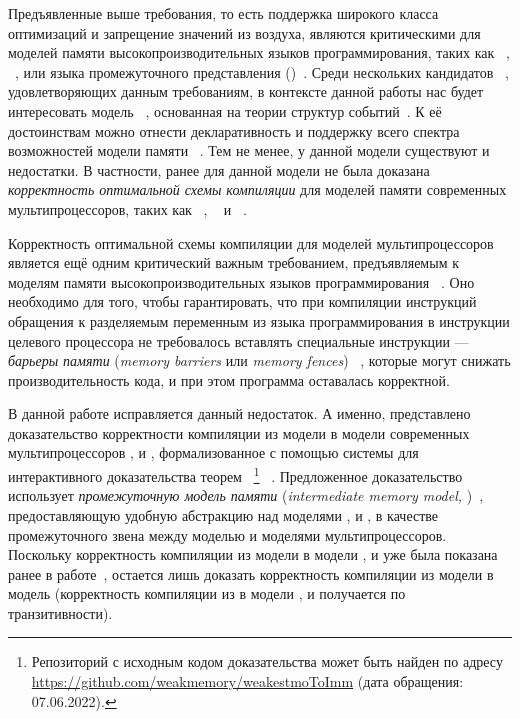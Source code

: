 Предъявленные выше требования, 
то есть поддержка широкого класса оптимизаций и 
запрещение значений из воздуха, являются 
критическими для моделей памяти высокопроизводительных 
языков программирования, таких как \CPP~\cite{Batty-al:POPL11}, 
\Java~\cite{Manson-al:POPL05}, или языка промежуточного представления \LLVM 
(\LLVMIR)~\cite{Chakraborty-Vafeiadis:CGO17}.
Среди нескольких кандидатов~%
\cite{Kang-al:POPL17,Paviotti-al:ESOP20,Jagadeesan-al:OOPSLA2020}, 
удовлетворяющих данным требованиям, в контексте данной работы нас будет 
интересовать модель \Wkm~\cite{Chakraborty-Vafeiadis:POPL19}, 
основанная на теории структур событий~\cite{Winskel:86}. 
К её достоинствам можно отнести декларативность и поддержку 
всего спектра возможностей модели памяти \CPP~\cite{Batty-al:POPL11}. 
Тем не менее, у данной модели существуют и недостатки. 
В частности, ранее для данной модели не была доказана 
\emph{корректность оптимальной схемы компиляции} для моделей памяти 
современных мультипроцессоров, таких как 
\Intel~\cite{Sewell-al:CACM10}, \ARM~\cite{Pulte-al:POPL18} 
и \POWER~\cite{Alglave-al:TOPLAS14}. 
 
Корректность оптимальной схемы компиляции для моделей мультипроцессоров 
является ещё одним критический важным требованием, 
предъявляемым к моделям памяти высокопроизводительных языков программирования%
~\cite{Moiseenko-al:PCS21}.
Оно необходимо для того, чтобы гарантировать, 
что при компиляции инструкций обращения к разделяемым переменным 
из языка программирования в инструкции целевого процессора
не требовалось вставлять специальные инструкции --- 
\emph{барьеры памяти} (\emph{memory barriers} или \emph{memory fences})%
~\cite{McKenney:2010}, которые могут снижать производительность кода,
и при этом программа оставалась корректной. 

В данной работе исправляется данный недостаток. 
А именно, представлено доказательство корректности компиляции
из модели \Wkm в модели современных мультипроцессоров \Intel, \ARM и \POWER, 
формализованное с помощью системы для интерактивного 
доказательства теорем~\coq%
\footnote{Репозиторий с исходным кодом доказательства может быть найден 
по адресу \url{https://github.com/weakmemory/weakestmoToImm} (дата обращения: 07.06.2022).}%
~\cite{Coq}.
Предложенное доказательство использует \emph{промежуточную модель памяти}
(\emph{intermediate memory model, \IMM})~\cite{Podkopaev-al:POPL19}, 
предоставляющую удобную абстракцию над моделями \Intel, \ARM и \POWER, 
в качестве промежуточного звена между моделью \Wkm и моделями мультипроцессоров.
Поскольку корректность компиляции из модели \IMM в модели \Intel, \ARM и \POWER
уже была показана ранее в работе~\cite{Podkopaev-al:POPL19},
остается лишь доказать корректность компиляции из модели \Wkm
в модель \IMM (корректность компиляции из \Wkm в модели \Intel, \ARM и \POWER
получается по транзитивности). 

